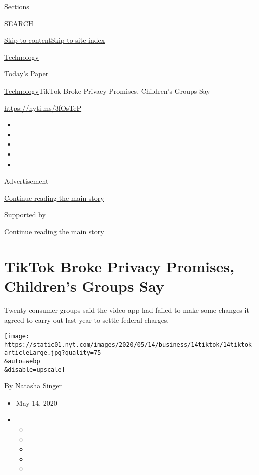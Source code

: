 Sections

SEARCH

\protect\hyperlink{site-content}{Skip to
content}\protect\hyperlink{site-index}{Skip to site index}

\href{https://www.nytimes.com/section/technology}{Technology}

\href{https://myaccount.nytimes.com/auth/login?response_type=cookie\&client_id=vi}{}

\href{https://www.nytimes.com/section/todayspaper}{Today's Paper}

\href{/section/technology}{Technology}\textbar{}TikTok Broke Privacy
Promises, Children's Groups Say

\url{https://nyti.ms/3fOsTeP}

\begin{itemize}
\item
\item
\item
\item
\item
\end{itemize}

Advertisement

\protect\hyperlink{after-top}{Continue reading the main story}

Supported by

\protect\hyperlink{after-sponsor}{Continue reading the main story}

\hypertarget{tiktok-broke-privacy-promises-childrens-groups-say}{%
\section{TikTok Broke Privacy Promises, Children's Groups
Say}\label{tiktok-broke-privacy-promises-childrens-groups-say}}

Twenty consumer groups said the video app had failed to make some
changes it agreed to carry out last year to settle federal charges.

\texttt{[image: https://static01.nyt.com/images/2020/05/14/business/14tiktok/14tiktok-articleLarge.jpg?quality=75\\\&auto=webp\\\&disable=upscale]}

By \href{https://www.nytimes.com/by/natasha-singer}{Natasha Singer}

\begin{itemize}
\item
  May 14, 2020
\item
  \begin{itemize}
  \item
  \item
  \item
  \item
  \item
  \end{itemize}
\end{itemize}

